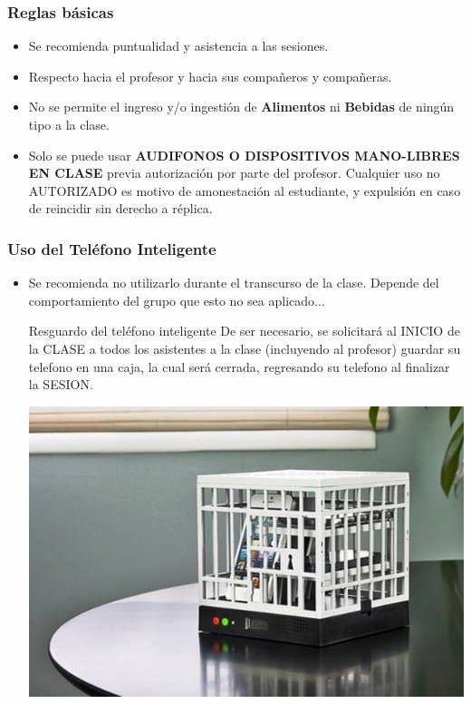 
\begin{frame}
\frametitle{Reglas básicas}
\begin{itemize}
\item Se recomienda puntualidad y asistencia a las sesiones.
\item Respecto hacia el profesor y hacia sus compañeros y compañeras.  
\item No se permite el ingreso y/o ingestión de \textbf{Alimentos} ni \textbf{Bebidas} de ningún tipo a la clase. 
\item Solo se puede usar \textbf{AUDIFONOS O DISPOSITIVOS MANO-LIBRES EN CLASE} previa autorización por parte del profesor. Cualquier uso no AUTORIZADO es motivo de amonestación  al estudiante, y expulsión en caso de reincidir sin derecho a r\'eplica. 
\end{itemize}
\end{frame}

\begin{frame}
\frametitle{Uso del Teléfono Inteligente}
\begin{itemize}
\item Se recomienda no utilizarlo durante el transcurso de la clase. Depende del comportamiento del grupo que esto no sea aplicado...
\begin{block}{Resguardo del teléfono inteligente}
De ser necesario, se solicitará al INICIO de la CLASE a todos los asistentes a la clase (incluyendo al profesor) guardar su telefono en una caja, la cual será cerrada, regresando su telefono al finalizar la SESION.
\begin{center}
\includegraphics[width=0.35\linewidth]{ReglasBasicas/CajaFuerteCeluar.jpg}
\end{center}
\end{block}
\end{itemize}
\end{frame}



